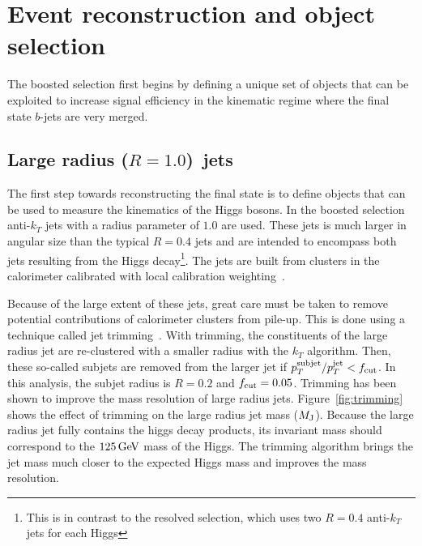 \section{Event reconstruction and object selection}

The boosted selection first begins by defining a unique set of objects that can be exploited to increase signal efficiency in the kinematic regime where the final state $b$-jets are very merged. 

\subsection{Large radius ($R = 1.0$)\, jets}

The first step towards reconstructing the final state is to define objects that can be used to measure the kinematics of the Higgs bosons. In the boosted selection anti-$k_{T}$ jets with a radius parameter of $1.0$ are used. These jets is much larger in angular size than the typical $R=0.4$ jets and are intended to encompass both jets resulting from the Higgs decay\footnote{This is in contrast to the resolved selection, which uses two $R=0.4$ anti-$k_{T}$ jets for each Higgs}. The jets are built from clusters in the calorimeter calibrated with local calibration weighting~\cite{JetCalib}. 

Because of the large extent of these jets, great care must be taken to remove potential contributions of calorimeter clusters from pile-up. This is done using a technique called jet trimming~\cite{Trimming}. With trimming, the constituents of the large radius jet are re-clustered with a smaller radius with the $k_{T}$ algorithm. Then, these so-called subjets are removed from the larger jet if $p_{T}^{\rm subjet}/p_{T}^{\rm jet} < f_{\rm cut}$. In this analysis, the subjet radius is $R = 0.2$ and $f_{\rm cut} = 0.05$. Trimming has been shown to improve the mass resolution of large radius jets. Figure~\ref{fig:trimming} shows the effect of trimming on the large radius jet mass ($M_{\rm J}$). Because the large radius jet fully contains the higgs decay products, its invariant mass should correspond to the $125 \GeV$ mass of the Higgs. The trimming algorithm brings the jet mass much closer to the expected Higgs mass and improves the mass resolution. 

